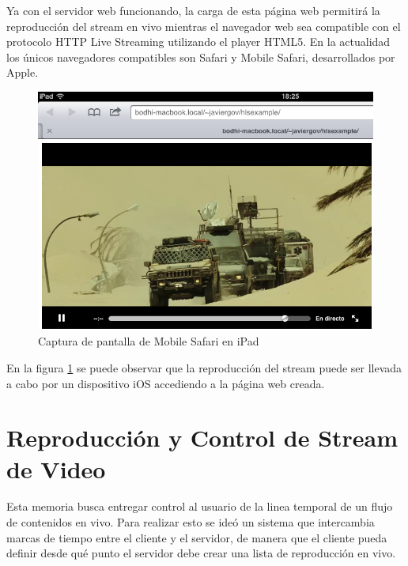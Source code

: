 Ya con el servidor web funcionando, la carga de esta página web permitirá la reproducción del stream en vivo mientras el navegador web sea compatible con el protocolo HTTP Live Streaming utilizando el player HTML5. En la actualidad los únicos navegadores compatibles son Safari y Mobile Safari, desarrollados por Apple.\\
\begin{figure}[h!]
	\centering
	\includegraphics[scale=0.6]{imgs/ipad-hlsexample.png}
	\caption{Captura de pantalla de Mobile Safari en iPad}
	\label{ipad-hlsexample}	
\end{figure}

En la figura \ref{ipad-hlsexample} se puede observar que la reproducción del stream puede ser llevada a cabo por un dispositivo iOS accediendo a la página web creada.\\








	
	
\section{Reproducción y Control de Stream de Video}

	Esta memoria busca entregar control al usuario de la linea temporal de un flujo de contenidos en vivo. Para realizar esto se ideó un sistema que intercambia marcas de tiempo entre el cliente y el servidor, de manera que el cliente pueda definir desde qué punto el servidor debe crear una lista de reproducción en vivo. \\
	
